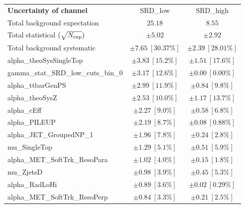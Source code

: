 
\begin{table}
\begin{center}
\setlength{\tabcolsep}{0.0pc}
\begin{tabular*}{\textwidth}{@{\extracolsep{\fill}}lcc}
\noalign{\smallskip}\hline\noalign{\smallskip}
{\bf Uncertainty of channel}                                    & SRD\_low            & SRD\_high            \\
\noalign{\smallskip}\hline\noalign{\smallskip}
Total background expectation             &  $25.18$        &  $8.55$       \\
\noalign{\smallskip}\hline\noalign{\smallskip}
Total statistical $(\sqrt{N_{\rm exp}})$              & $\pm 5.02$        & $\pm 2.92$       \\
Total background systematic               & $\pm 7.65\ [30.37\%] $        & $\pm 2.39\ [28.01\%] $             \\
\noalign{\smallskip}\hline\noalign{\smallskip}
\noalign{\smallskip}\hline\noalign{\smallskip}
alpha\_theoSysSingleTop         & $\pm 3.83\ [15.2\%] $          & $\pm 1.51\ [17.6\%] $       \\
gamma\_stat\_SRD\_low\_cuts\_bin\_0         & $\pm 3.17\ [12.6\%] $          & $\pm 0.00\ [0.00\%] $       \\
alpha\_ttbarGenPS         & $\pm 2.99\ [11.9\%] $          & $\pm 0.84\ [9.8\%] $       \\
alpha\_theoSysZ         & $\pm 2.53\ [10.0\%] $          & $\pm 1.17\ [13.7\%] $       \\
alpha\_cEff         & $\pm 2.27\ [9.0\%] $          & $\pm 0.58\ [6.8\%] $       \\
alpha\_PILEUP         & $\pm 2.19\ [8.7\%] $          & $\pm 0.08\ [0.88\%] $       \\
alpha\_JET\_GroupedNP\_1         & $\pm 1.96\ [7.8\%] $          & $\pm 0.24\ [2.8\%] $       \\
mu\_SingleTop         & $\pm 1.29\ [5.1\%] $          & $\pm 0.51\ [5.9\%] $       \\
alpha\_MET\_SoftTrk\_ResoPara         & $\pm 1.02\ [4.0\%] $          & $\pm 0.15\ [1.8\%] $       \\
mu\_ZjetsD         & $\pm 0.98\ [3.9\%] $          & $\pm 0.45\ [5.3\%] $       \\
alpha\_RadLoHi         & $\pm 0.89\ [3.6\%] $          & $\pm 0.02\ [0.29\%] $       \\
alpha\_MET\_SoftTrk\_ResoPerp         & $\pm 0.84\ [3.3\%] $          & $\pm 0.21\ [2.5\%] $       \\

\end{tabular*}
\end{center}
\end{table}
